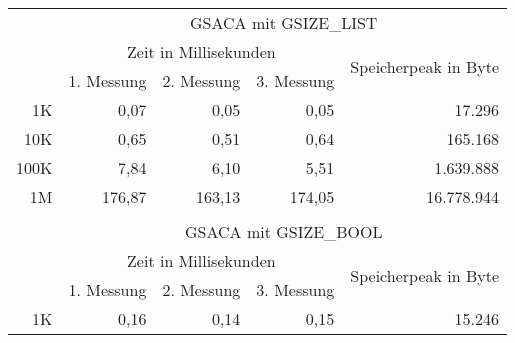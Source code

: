 \begin{table}[H]
\begin{tabular}{rrrrr}
\multicolumn{1}{l}{} & \multicolumn{4}{c}{GSACA mit GSIZE\_LIST}                                                                                                                    \\
\multicolumn{1}{l}{} & \multicolumn{3}{c}{Zeit in Millisekunden}                                                        & \multicolumn{1}{c}{\multirow{2}{*}{Speicherpeak in Byte}} \\
\multicolumn{1}{l}{} & \multicolumn{1}{c}{1. Messung} & \multicolumn{1}{c}{2. Messung} & \multicolumn{1}{c}{3. Messung} & \multicolumn{1}{c}{}                                      \\
1K                   & 0,07                           & 0,05                           & 0,05                           & 17.296                                                    \\
10K                  & 0,65                           & 0,51                           & 0,64                           & 165.168                                                   \\
100K                 & 7,84                           & 6,10                           & 5,51                           & 1.639.888                                                 \\
1M                   & 176,87                         & 163,13                         & 174,05                         & 16.778.944                                                \\
\multicolumn{1}{l}{} & \multicolumn{1}{l}{}           & \multicolumn{1}{l}{}           & \multicolumn{1}{l}{}           & \multicolumn{1}{l}{}                                      \\
\multicolumn{1}{l}{} & \multicolumn{4}{c}{GSACA mit GSIZE\_BOOL}                                                                                                                    \\
\multicolumn{1}{l}{} & \multicolumn{3}{c}{Zeit in Millisekunden}                                                        & \multicolumn{1}{c}{\multirow{2}{*}{Speicherpeak in Byte}} \\
\multicolumn{1}{l}{} & \multicolumn{1}{c}{1. Messung} & \multicolumn{1}{c}{2. Messung} & \multicolumn{1}{c}{3. Messung} & \multicolumn{1}{c}{}                                      \\
1K                   & 0,16                           & 0,14                           & 0,15                           & 15.246                                                    \\

\end{tabular}
\end{table}
